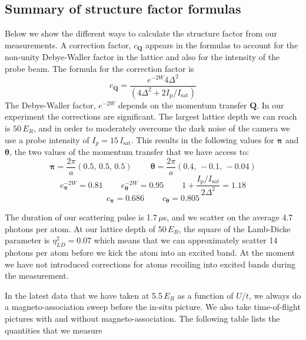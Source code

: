 \documentclass[11pt,letter]{article}
\newcommand{\bv}[1]{\ensuremath{\bm{#1}}}
\newcommand{\isat}{\ensuremath{I_{\mathrm{sat}}}}
\newcommand{\iisat}{\ensuremath{I_{\mathrm{p}}/I_{\mathrm{sat}}}}
\begin{document}
\newpage
 
\subsection{Summary of structure factor formulas }    

Below we show the different ways to calculate the structure factor from our
measurements.  A correction factor, $c_{\bv{Q}}$ appears in the formulas to
account for the non-unity Debye-Waller factor in the lattice and also for the
intensity of the probe beam.  The formula for the correction factor is 
\begin{equation} 
      c_{\bv{Q}} = \frac{ e^{-2W}4 \Delta^{2}  } 
           {(4 \Delta^{2} + 2 \iisat) }
\end{equation} 
The Debye-Waller factor, $e^{-2W}$ depends on the momentum transfer $\bv{Q}$.
In our experiment the corrections are significant.  The largest lattice depth
we can reach is $50\,E_{R}$, and in order to moderately overcome the dark noise
of the camera we use a probe intensity of $I_{p}=15\,\isat$.   This results in
the following values for $\bv{\pi}$ and $\bv{\theta}$, the two values of the
momentum transfer that we have access to:
\begin{equation}
\bv{\pi} = \frac{2\pi}{a} ( 0.5,\, 0.5,\, 0.5 ) 
\ \ \ \ \ \ \ \ \ \
 \bv{\theta} = \frac{2\pi}{a}( 0.4,\, -0.1,\, -0.04 )
\end{equation}
\begin{equation}
  e^{-2W}_{\bv{\pi}} =  0.81
 \ \ \ \ \ \ \ \ \ \ 
  e^{-2W}_{\bv{\theta}} = 0.95
 \ \ \ \ \ \ \ \ \ \ 
  1  +   \frac{\iisat}{2\Delta^{2} } =  1.18  
\end{equation}
\begin{equation}
  c_{\bv{\pi}} =  0.686
 \ \ \ \ \ \ \ \ \ \ 
  c_{\bv{\theta}} = 0.805 
\end{equation}

The duration of our scattering pulse is 1.7\,$\mu$s, and we scatter on the
average 4.7 photons per atom.   At our lattice depth of 50\,$E_{R}$, the square
of the Lamb-Dicke parameter is $\eta_{LD}^{2} = 0.07$ which means that we can
approximately scatter 14 photons per atom before we kick the atom into an
excited band.  At the moment we have not introduced corrections for atoms
recoiling into excited bands during the measurement. 

In the latest data that we have taken at 5.5\,$E_{R}$ as a function of $U/t$, we
always do a magneto-association sweep before the in-situ picture.   We also
take time-of-flight pictures with and without magneto-association.  The
following table lists the quantities that we measure 
\end{document}
